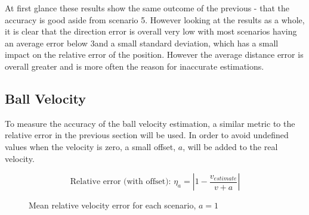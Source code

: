 At first glance these results show the same outcome of the previous - that the accuracy is good aside from scenario 5. However looking at the results as a whole, it is clear that the direction error is overall very low with most scenarios having an average error below 3\degree and a small standard deviation, which has a small impact on the relative error of the position. However the average distance error is overall greater and is more often the reason for inaccurate estimations. 

\subsection{Ball Velocity}

To measure the accuracy of the ball velocity estimation, a similar metric to the relative error in the previous section will be used. In order to avoid undefined values when the velocity is zero, a small offset, $a$, will be added to the real velocity. 

\[ \text{Relative error (with offset): } \eta_a =  |1 - \frac{v_{estimate}}{v + a}|\]

\begin{figure}[H]
    \centering
    \caption{Mean relative velocity error for each scenario, $a=1$}
    \label{fig:velocity error}
\end{figure}

